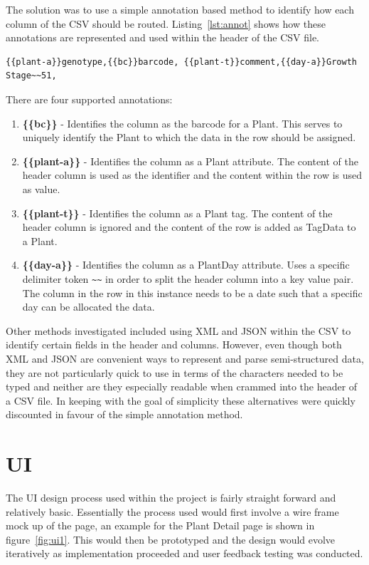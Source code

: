 The solution was to use a simple annotation based method to identify how each column of the CSV should be routed. Listing~\ref{lst:annot} shows how these annotations are represented and used within the header of the CSV file. 
\begin{lstlisting}[label={lst:annot},caption=Excerpt showing annotated CSV header for data import]
{{plant-a}}genotype,{{bc}}barcode, {{plant-t}}comment,{{day-a}}Growth Stage~~51,
\end{lstlisting}
There are four supported annotations:
\begin{enumerate}
\item \textbf{\{\{bc\}\}} - Identifies the column as the barcode for a Plant. This serves to uniquely identify the Plant to which the data in the row should be assigned.
\item \textbf{\{\{plant-a\}\}} - Identifies the column as a Plant attribute. The content of the header column is used as the identifier and the content within the row is used as value. 
\item \textbf{\{\{plant-t\}\}} - Identifies the column as a Plant tag. The content of the header column is ignored and the content of the row is added as TagData to a Plant.
\item \textbf{\{\{day-a\}\}} - Identifies the column as a PlantDay attribute. Uses a specific delimiter token \verb|~~| in order to split the header column into a key value pair. The column in the row in this instance needs to be a date such that a specific day can be allocated the data.
\end{enumerate}

Other methods investigated included using XML and JSON within the CSV to identify certain fields in the header and columns. However, even though both XML and JSON are convenient ways to represent and parse semi-structured data, they are not particularly quick to use in terms of the characters needed to be typed and neither are they especially readable when crammed into the header of a CSV file. In keeping with the goal of simplicity these alternatives were quickly discounted in favour of the simple annotation method. 

\section{UI}
The UI design process used within the project is fairly straight forward and relatively basic. Essentially the process used would first involve a wire frame mock up of the page, an example for the Plant Detail page is shown in figure~\ref{fig:ui1}. This would then be prototyped and the design would evolve iteratively as implementation proceeded and user feedback testing was conducted.

